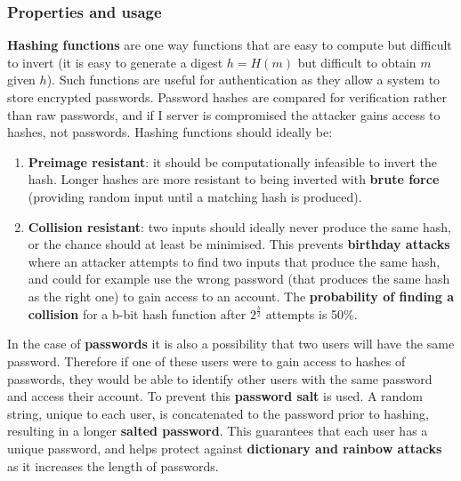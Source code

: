\documentclass[final]{article}
\begin{document}
\subsubsection{Properties and usage}
\textbf{Hashing functions} are one way functions that are easy to compute but difficult to invert (it is easy to generate a digest $ h = H(m) $ but difficult to obtain $ m $ given $ h $). Such functions are useful for authentication as they allow a system to store encrypted passwords. Password hashes are compared for verification rather than raw passwords, and if I server is compromised the attacker gains access to hashes, not passwords. Hashing functions should ideally be:
\begin{enumerate}
	\item \textbf{Preimage resistant}: it should be computationally infeasible to invert the hash. Longer hashes are more resistant to being inverted with \textbf{brute force} (providing random input until a matching hash is produced).
	\item \textbf{Collision resistant}: two inputs should ideally never produce the same hash, or the chance should at least be minimised. This prevents \textbf{birthday attacks} where an attacker attempts to find two inputs that produce the same hash, and could for example use the wrong password (that produces the same hash as the right one) to gain access to an account. The \textbf{probability of finding a collision} for a b-bit hash function after $ 2^{\frac{b}{2}} $ attempts is 50\%.
\end{enumerate}
In the case of \textbf{passwords} it is also a possibility that two users will have the same password. Therefore if one of these users were to gain access to hashes of passwords, they would be able to identify other users with the same password and access their account. To prevent this \textbf{password salt} is used. A random string, unique to each user, is concatenated to the password prior to hashing, resulting in a longer \textbf{salted password}. This guarantees that each user has a unique password, and helps protect against \textbf{dictionary and rainbow attacks} as it increases the length of passwords.
\end{document}
